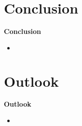 \documentclass[9pt]{beamer}
\begin{document}
\section{Conclusion}
\begin{frame}
	\begin{alertblock}{
		\begin{center}
			\Large{\textbf{Conclusion}}
		\end{center}}
	\end{alertblock}
\end{frame}
\begin{frame}
	\begin{itemize}
		\item
	\end{itemize}
\end{frame}
\section{Outlook}
\begin{frame}
	\begin{alertblock}{
		\begin{center}
			\Large{\textbf{Outlook}}
		\end{center}}
	\end{alertblock}
\end{frame}
\begin{frame}
	\begin{itemize}
		\item
	\end{itemize}
\end{frame}
\end{document}
